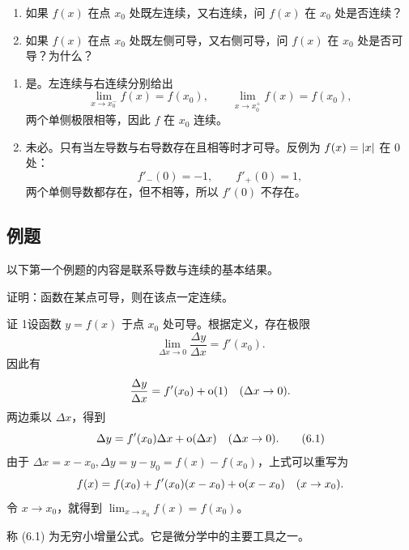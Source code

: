 \begin{xthought}[10]
\begin{enumerate}[label=(\arabic*)]
    \item 如果 $f(x)$ 在点 $x_0$ 处既左连续，又右连续，问 $f(x)$ 在 $x_0$ 处是否连续？
    \item 如果 $f(x)$ 在点 $x_0$ 处既左侧可导，又右侧可导，问 $f(x)$ 在 $x_0$ 处是否可导？为什么？
  \end{enumerate}
\end{xthought}
\begin{xsolution}
\begin{enumerate}[label=(\arabic*)]
  \item 是。左连续与右连续分别给出
  \[
    \lim_{x\to x_0^-}f(x)=f(x_0),
    \qquad
    \lim_{x\to x_0^+}f(x)=f(x_0),
  \]
  两个单侧极限相等，因此 $f$ 在 $x_0$ 连续。

  \item 未必。只有当左导数与右导数存在且相等时才可导。反例为 $f(x)=\lvert x\rvert$ 在 $0$ 处：
  \[
    f'_-(0)=-1,\qquad f'_+(0)=1,
  \]
  两个单侧导数都存在，但不相等，所以 $f'(0)$ 不存在。
\end{enumerate}
\end{xsolution}


\subsection{例题}

以下第一个例题的内容是联系导数与连续的基本结果。

\begin{xexample}[6.1.1]
证明：函数在某点可导，则在该点一定连续。
\end{xexample}
\begin{xproof}
证 1\quad 设函数 $y=f(x)$ 于点 $x_0$ 处可导。根据定义，存在极限
\[
  \lim_{\Delta x\to0}\frac{\Delta y}{\Delta x}=f'(x_0).
\]
因此有
\[
  \frac{\Delta y}{\Delta x}=f'(x_0)+\mathrm{o}(1)\quad(\Delta x\to0).
\]
两边乘以 $\Delta x$，得到
\begin{equation}
  \Delta y=f'(x_0)\Delta x+\mathrm{o}(\Delta x)\quad(\Delta x\to0).
  \tag{6.1}
  \label{eq:6.1}
\end{equation}
由于 $\Delta x=x-x_0,\Delta y=y-y_0=f(x)-f(x_0)$，上式可以重写为
\[
  f(x)=f(x_0)+f'(x_0)(x-x_0)+\mathrm{o}(x-x_0)\quad(x\to x_0).
\]
令 $x\to x_0$，就得到 $\lim_{x\to x_0}f(x)=f(x_0)$。
\end{xproof}

\begin{xremark}
称 (6.1) 为无穷小增量公式。它是微分学中的主要工具之一。
\end{xremark}

